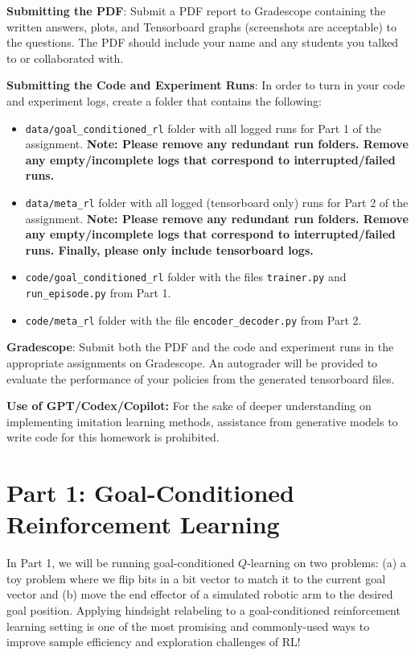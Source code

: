 \documentclass[12pt]{article}
\begin{document}
\vspace{0.2cm}
\noindent\textbf{Submitting the PDF}: Submit a PDF report to Gradescope containing the written answers, plots, and Tensorboard graphs (screenshots are acceptable) to the questions. The PDF should include your name and any students you talked to or collaborated with.

\vspace{0.2cm}

\noindent\textbf{Submitting the Code and Experiment Runs}: In order to turn in your code and experiment logs, create a folder that contains the following:
\begin{itemize}
\item \texttt{data/goal\_conditioned\_rl} folder with all logged runs for Part 1 of the assignment. \textbf{Note: Please remove any redundant run folders. Remove any empty/incomplete logs that correspond to interrupted/failed runs.}

\item \texttt{data/meta\_rl} folder with all logged (tensorboard only) runs for Part 2 of the assignment. \textbf{Note: Please remove any redundant run folders. Remove any empty/incomplete logs that correspond to interrupted/failed runs. Finally, please only include tensorboard logs.}

\item \texttt{code/goal\_conditioned\_rl} folder with the files \texttt{trainer.py} and \texttt{run\_episode.py} from Part 1.

\item \texttt{code/meta\_rl} folder with the file \texttt{encoder\_decoder.py} from Part 2.
\end{itemize} 

\noindent\textbf{Gradescope}: Submit both the PDF and the code and experiment runs in the appropriate assignments on Gradescope. An autograder will be provided to evaluate the performance of your policies from the generated tensorboard files. 

\noindent\textbf{Use of GPT/Codex/Copilot:} For the sake of deeper understanding on implementing imitation learning methods, assistance from generative models to write code for this homework is prohibited. 

\newpage
\section*{Part 1: Goal-Conditioned Reinforcement Learning}

In Part 1, we will be running goal-conditioned $Q$-learning on two problems: (a) a toy problem where we flip bits in a bit vector to match it to the current goal vector and (b) move the end effector of a simulated robotic arm to the desired goal position. Applying hindsight relabeling to a goal-conditioned reinforcement learning setting is one of the most promising and commonly-used ways to improve sample efficiency and exploration challenges of RL!
\end{document}
